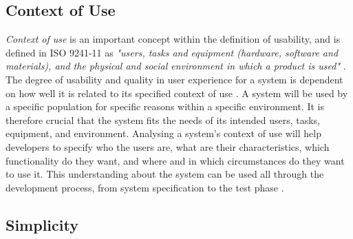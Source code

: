\subsection{Context of Use}
\emph{Context of use} is an important concept within the definition of usability, and is defined in ISO 9241-11 as \emph{"users, tasks and equipment (hardware, software and materials), and the physical and social environment in which a product is used"} \cite{maguire2001context}.  The degree of usability and quality in user experience for a system is dependent on how well it is related to its specified context of use \cite{bevan1995human}. A system will be used by a specific population for specific reasons within a specific environment. It is therefore crucial that the system fits the needs of its intended users, tasks, equipment, and environment. Analysing a system's context of use will help developers to specify who the users are, what are their characteristics, which functionality do they want, and where and in which circumstances do they want to use it. This understanding about the system can be used all through the development process, from system specification to the test phase \cite{maguire2001context}.

\subsection{Simplicity}
\label{sec:simplicity}


